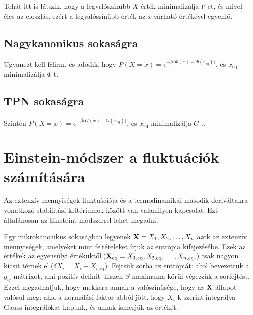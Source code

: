    Tehát itt is látszik, hogy a legvalószínűbb $X$ érték minimalizálja $F$-et, és mivel éles az eloszlás, ezért a legvalószínűbb érték az $x$ várható értékével egyenlő.
   
  \subsection{Nagykanonikus sokaságra}
   
   Ugyanezt kell felírni, és adódik, hogy $P(X=x)=e^{-\beta\big(\Phi(x)-\Phi(x_\text{eq})\big)}$, és $x_\text{eq}$ minimalizálja $\Phi$-t. 
   
  \subsection{TPN sokaságra}
  
   Szintén $P(X=x)=e^{-\beta\big(G(x)-G(x_\text{eq})\big)}$, és $x_\text{eq}$ minimalizálja $G$-t. 
  
 \section{Einstein-módszer a fluktuációk számítására} 
  
  Az extenzív mennyiségek fluktuációja és a termodinamikai második deriváltakra vonatkozó stabilitási kritériumok között van valamilyen kapcsolat. Ezt általánosan az Einsteint-módszerrel lehet megadni. 
  
  Egy mikrokanonikus sokaságban legyenek $\mathbf{X}=X_1,X_2,\dots,X_n$ azok az extenzív mennyiségek, amelyeket mint feltételeket írjuk az entrópia kifejezésébe. Ezek az értékek az egyensúlyi értéküktől ($\mathbf{X}_\text{eq}=X_{1,\text{eq}},X_{2,\text{eq}},\dots,X_{n,\text{eq}},$) csak nagyon kicsit térnek el ($\delta X_i=X_i-X_{i,\text{eq}}$). Fejtsük sorba az entrópiát:
  ahol bevezettük a $g_{ij}$ mátrixot, ami pozitív definit, hiszen $S$ maximuma körül végezzük a sorfejtést. Ezzel megadhatjuk, hogy mekkora annak a valószínűsége, hogy az $\mathbf{X}$ állapot valósul meg:
  ahol a normálási faktor abból jött, hogy $X_i$-k szerint integrálva Gauss-integrálokat kapunk, és annak ismerjük az értékét. 
  
